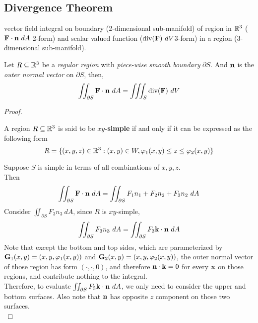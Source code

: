 \documentclass[11pt]{article}
\begin{document}
		\subsection{Divergence Theorem}
			\begin{remark}
				vector field integral on boundary (2-dimensional sub-manifold) of region in $\mathbb{R}^3$ ($\textbf{F} \cdot \textbf{n}\ dA$ 2-form) and scalar valued function ($\dive (\ve{F})\ dV$3-form) in a region (3-dimensional sub-manifold).
			\end{remark}
			
			\begin{theorem}
				Let $R \subseteq \mathbb{R}^3$ be a \emph{regular region} with \emph{piece-wise smooth boundary} $\partial S$. And $\textbf{n}$ is the \emph{outer normal vector} on $\partial S$, then,
				\begin{equation}
					\iint_{\partial S} \textbf{F} \cdot \textbf{n}\ dA = \iiint_S \text{div} (\textbf{F})\ dV
				\end{equation}
				\begin{proof}[Proof]
					\begin{definition}
						A region $R \subseteq \mathbb{R}^3$ is said to be \textbf{$xy$-simple} if and only if it can be expressed as the following form
						\begin{equation}
							R = \{(x,y,z)\in \mathbb{R}^3: (x, y) \in W,\varphi_1(x, y) \leq z \leq \varphi_2(x, y)\}
						\end{equation}
					\end{definition}
				Suppose $S$ is simple in terms of all combinations of $x, y, z$. \\
				Then
				\begin{gather}
					\iint_{\partial S} \textbf{F} \cdot \textbf{n}\ dA 
					= \iint_{\partial S} F_1 n_1 + F_2 n_2 + F_3 n_2\ dA
				\end{gather}
				Consider $\iint_{\partial S} F_3 n_3\ dA$, since $R$ is $xy$-simple, 
				\begin{gather}
					\iint_{\partial S} F_3 n_3\ dA = \iint_{\partial S} F_3 \textbf{k} \cdot \textbf{n}\ dA
				\end{gather}
				Note that except the bottom and top sides, which are parameterized by $\textbf{G}_1(x, y) = (x, y, \varphi_1(x, y))$ and $\textbf{G}_2(x, y) = (x, y, \varphi_2(x, y))$,
				 the outer normal vector of those region has form $(\cdot, \cdot, 0)$, and therefore $\textbf{n}\cdot \textbf{k} = 0$ for every $\textbf{x}$ on those regions, and contribute nothing to the integral. \\
				 Therefore, to evaluate $\iint_{\partial S} F_3 \textbf{k} \cdot \textbf{n}\ dA$, we only need to consider the upper and bottom surfaces. Also note that $\textbf{n}$ has opposite $z$ component on those two surfaces. \\

\end{proof}
\end{theorem}
\end{document}
